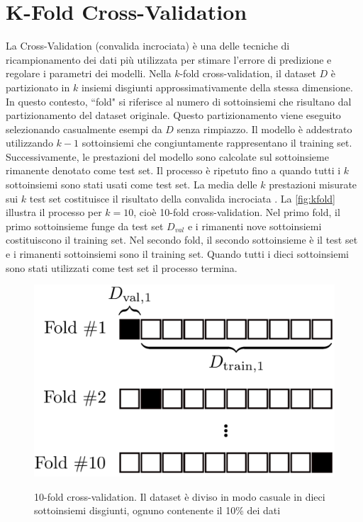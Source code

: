 \documentclass[12pt,italian]{report}
\begin{document}
\section{K-Fold Cross-Validation} \label{sec:k-fold}
La Cross-Validation (convalida incrociata) è una delle tecniche di ricampionamento dei dati più utilizzata per stimare l'errore di predizione e regolare i parametri dei modelli. Nella $k$-fold cross-validation, il dataset $D$ è partizionato in $k$ insiemi disgiunti approssimativamente della stessa dimensione. In questo contesto, ``fold" si riferisce al numero di sottoinsiemi che risultano dal partizionamento del dataset originale. Questo partizionamento viene eseguito selezionando casualmente esempi da $D$ senza rimpiazzo. Il modello è addestrato utilizzando $k-1$ sottoinsiemi che congiuntamente rappresentano il training set. Successivamente, le prestazioni del modello sono calcolate sul sottoinsieme rimanente denotato come test set. Il processo è ripetuto fino a quando tutti i $k$ sottoinsiemi sono stati usati come test set. La media delle $k$ prestazioni misurate sui $k$ test set costituisce il risultato della convalida incrociata \cite{k-fold}. La \autoref{fig:kfold} illustra il processo per $k=10$, cioè 10-fold cross-validation. Nel primo fold, il primo sottoinsieme funge da test set $D_{val}$ e i rimanenti nove sottoinsiemi costituiscono il training set. Nel secondo fold, il secondo sottoinsieme è il test set e i rimanenti sottoinsiemi sono il training set. Quando tutti i dieci sottoinsiemi sono stati utilizzati come test set il processo termina.

\begin{figure}
  \centering
  \includegraphics[scale=0.35]{immagini/kfold.png}
  \caption{10-fold cross-validation. Il dataset è diviso in modo casuale in dieci sottoinsiemi disgiunti, ognuno contenente il 10\% dei dati}
  \cite{k-fold}
  \label{fig:kfold}
\end{figure}
\end{document}

